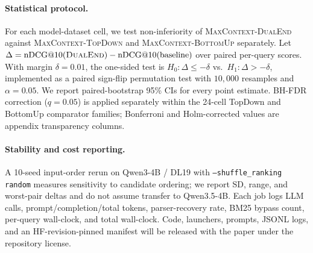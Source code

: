 \paragraph{Statistical protocol.}
For each model-dataset cell, we test non-inferiority of
\textsc{MaxContext-DualEnd} against \textsc{MaxContext-TopDown} and
\textsc{MaxContext-BottomUp} separately. Let
$\Delta = \text{nDCG@10}(\textsc{DualEnd}) -
\text{nDCG@10}(\text{baseline})$ over paired per-query scores. With
margin $\delta=0.01$, the one-sided test is
$H_0: \Delta \le -\delta$ vs.\ $H_1: \Delta > -\delta$, implemented as a
paired sign-flip permutation test with $10{,}000$ resamples and
$\alpha=0.05$. We report paired-bootstrap 95\% CIs for every point
estimate. BH-FDR correction ($q=0.05$) is applied separately within the
24-cell TopDown and BottomUp comparator families; Bonferroni and
Holm-corrected values are appendix transparency columns.

\paragraph{Stability and cost reporting.}
A 10-seed input-order rerun on Qwen3-4B / DL19 with
\texttt{--shuffle\_ranking random} measures sensitivity to candidate
ordering; we report SD, range, and worst-pair deltas and do not assume
transfer to Qwen3.5-4B. Each job logs LLM calls, prompt/completion/total
tokens, parser-recovery rate, BM25 bypass count, per-query wall-clock,
and total wall-clock. Code, launchers, prompts, JSONL logs, and an
HF-revision-pinned manifest will be released with the paper under the
repository license.
